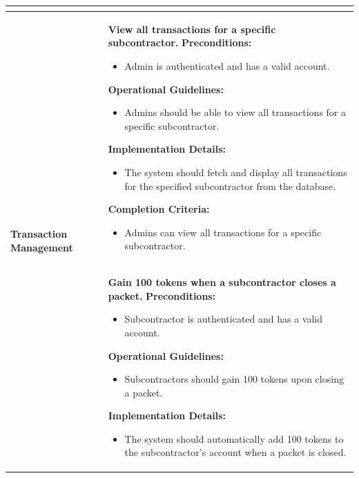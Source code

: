 \begin{longtable}{ | p{} | p{} | }
\begin{itemize}
    \end{itemize} \\
    \hline
    \multirow{2}{=}{\textbf{Transaction Management}} & \textbf{View all transactions for a specific subcontractor.} \newline
    \textbf{Preconditions:} \newline
    \begin{itemize}
        \item Admin is authenticated and has a valid account.
    \end{itemize}
    \textbf{Operational Guidelines:} \newline
    \begin{itemize}
        \item Admins should be able to view all transactions for a specific subcontractor.
    \end{itemize}
    \textbf{Implementation Details:} \newline
    \begin{itemize}
        \item The system should fetch and display all transactions for the specified subcontractor from the database.
    \end{itemize}
    \textbf{Completion Criteria:} \newline
    \begin{itemize}
        \item Admins can view all transactions for a specific subcontractor.
    \end{itemize} \\
    \cline{2-2}
    & \textbf{Gain 100 tokens when a subcontractor closes a packet.} \newline
    \textbf{Preconditions:} \newline
    \begin{itemize}
        \item Subcontractor is authenticated and has a valid account.
    \end{itemize}
    \textbf{Operational Guidelines:} \newline
    \begin{itemize}
        \item Subcontractors should gain 100 tokens upon closing a packet.
    \end{itemize}
    \textbf{Implementation Details:} \newline
    \begin{itemize}
        \item The system should automatically add 100 tokens to the subcontractor's account when a packet is closed.

\end{itemize}
\end{longtable}
